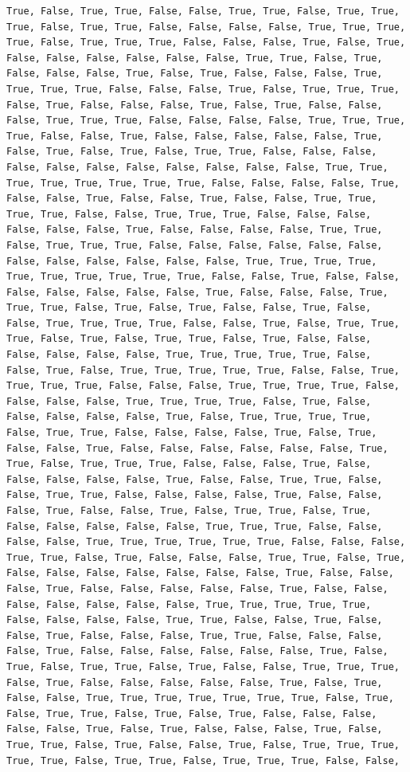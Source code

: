 \documentclass[
  letterpaper,
  DIV=11,
  numbers=noendperiod]{scrartcl}
\begin{document}
\begin{verbatim}
True, False, True, True, False, False, True, True, False, True, True, True, False, True, True, False, False, False, False, True, True, True, True, False, True, True, True, False, False, False, True, False, True, False, False, False, False, False, False, True, True, False, True, False, False, False, True, False, True, False, False, False, True, True, True, True, False, False, False, True, False, True, True, True, False, True, False, False, False, True, False, True, False, False, False, True, True, True, False, False, False, False, True, True, True, True, False, False, True, False, False, False, False, False, True, False, True, False, True, False, True, True, False, False, False, False, False, False, False, False, False, False, False, True, True, True, True, True, True, True, True, False, False, False, False, True, False, False, True, False, False, True, False, False, True, True, True, True, False, False, True, True, True, False, False, False, False, False, False, True, False, False, False, False, True, True, False, True, True, True, False, False, False, False, False, False, False, False, False, False, False, False, True, True, True, True, True, True, True, True, True, True, False, False, True, False, False, False, False, False, False, False, True, False, False, False, True, True, True, False, True, False, True, False, False, True, False, False, True, True, True, True, False, False, True, False, True, True, True, False, True, False, True, True, False, True, False, False, False, False, False, False, True, True, True, True, True, False, False, True, False, True, True, True, True, True, False, False, True, True, True, True, False, False, False, True, True, True, True, False, False, False, False, True, True, True, True, False, True, False, False, False, False, False, True, False, True, True, True, True, False, True, True, False, False, False, False, True, False, True, False, False, True, False, False, False, False, False, False, True, True, False, True, True, True, False, False, False, True, False, False, False, False, False, True, False, False, True, True, False, False, True, True, False, False, False, False, True, False, False, False, True, False, False, True, False, True, True, False, True, False, False, False, False, False, True, True, True, False, False, False, False, True, True, True, True, True, True, False, False, False, True, True, False, True, False, False, False, True, True, False, True, False, False, False, False, False, False, False, True, False, False, False, True, False, False, False, False, False, True, False, False, False, False, False, False, False, True, True, True, True, True, False, False, False, False, True, True, False, False, True, False, False, True, False, False, False, True, True, False, False, False, False, True, False, False, False, False, False, False, True, False, True, False, True, True, False, True, False, False, True, True, True, False, True, False, False, False, False, False, True, False, True, False, False, True, True, True, True, True, True, True, False, True, False, True, True, False, True, False, True, False, False, False, False, False, True, False, True, False, False, False, True, False, True, True, False, True, False, False, True, False, True, True, True, True, True, False, True, True, False, True, True, True, False, False, 
\end{verbatim}
\end{document}
